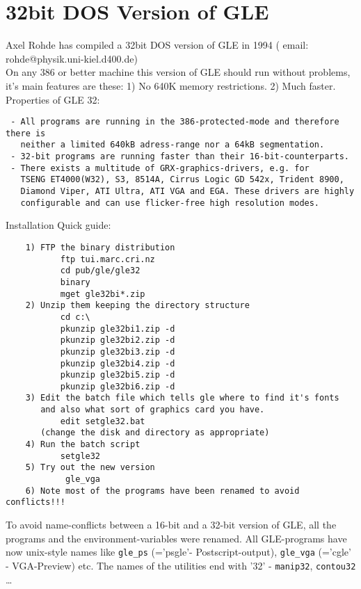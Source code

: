 \section{32bit DOS Version of GLE}
Axel Rohde has compiled a 32bit DOS version of GLE in 1994 
( email: rohde@physik.uni-kiel.d400.de)\\
On any 386 or better machine this version of GLE should 
run without problems, it's main features are these:
1) No 640K memory restrictions. 2) Much faster.\\
\clearpage
Properties of GLE 32:
\begin{verbatim}
 - All programs are running in the 386-protected-mode and therefore there is
   neither a limited 640kB adress-range nor a 64kB segmentation.
 - 32-bit programs are running faster than their 16-bit-counterparts.
 - There exists a multitude of GRX-graphics-drivers, e.g. for
   TSENG ET4000(W32), S3, 8514A, Cirrus Logic GD 542x, Trident 8900,
   Diamond Viper, ATI Ultra, ATI VGA and EGA. These drivers are highly
   configurable and can use flicker-free high resolution modes.
\end{verbatim}
Installation Quick guide:
\begin{verbatim}
    1) FTP the binary distribution
           ftp tui.marc.cri.nz
           cd pub/gle/gle32
           binary
           mget gle32bi*.zip
    2) Unzip them keeping the directory structure
           cd c:\
           pkunzip gle32bi1.zip -d
           pkunzip gle32bi2.zip -d
           pkunzip gle32bi3.zip -d
           pkunzip gle32bi4.zip -d
           pkunzip gle32bi5.zip -d
           pkunzip gle32bi6.zip -d
    3) Edit the batch file which tells gle where to find it's fonts
       and also what sort of graphics card you have.  
           edit setgle32.bat
       (change the disk and directory as appropriate)
    4) Run the batch script
           setgle32
    5) Try out the new version
            gle_vga
    6) Note most of the programs have been renamed to avoid conflicts!!!
\end{verbatim}

To avoid name-conflicts between a 16-bit and a 32-bit version of GLE, 
all the programs and the environment-variables were renamed. 
All GLE-programs have now unix-style names like \verb#gle_ps# (='psgle'-
Postscript-output), \verb#gle_vga# (='cgle' - VGA-Preview) etc. The names 
of the utilities end with '32' -  \verb#manip32#, \verb#contou32# \dots

